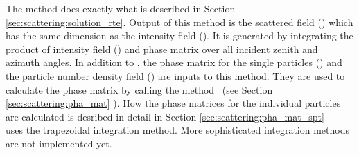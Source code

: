 \label{sec:scattering:sca_fieldCalc}
The method  does exactly what is
described in Section 
\ref{sec:scattering:solution_rte}.  Output of this method is the scattered field
() which has the same dimension as the intensity field
().  It is generated by integrating the product of
intensity field () and phase matrix
 over all incident zenith and azimuth angles.  In
addition to , the phase matrix for the single 
particles () and the particle number density field
() are inputs to this method.  They are used
to calculate the phase matrix  by calling the
method \ (see Section
\ref{sec:scattering:pha_mat} ). How the phase matrices for the individual particles are calculated is desribed in detail in Section \ref{sec:scattering:pha_mat_spt} \\ 
 uses the trapezoidal integration method. More sophisticated integration methods are not implemented yet.


\label{sec:scattering:RT_methods}

